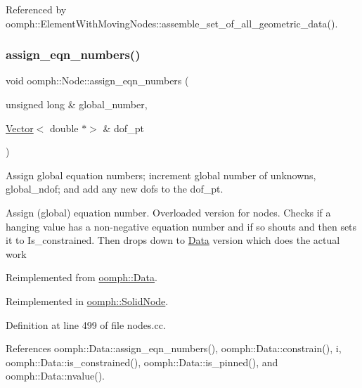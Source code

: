Referenced by oomph\+::\+Element\+With\+Moving\+Nodes\+::assemble\+\_\+set\+\_\+of\+\_\+all\+\_\+geometric\+\_\+data().

\mbox{\label{classoomph_1_1Node_a84ee77907c07ede64d98e809d9b0ffe0}} 
\subsubsection{\texorpdfstring{assign\+\_\+eqn\+\_\+numbers()}{assign\_eqn\_numbers()}}
{\footnotesize\ttfamily void oomph\+::\+Node\+::assign\+\_\+eqn\+\_\+numbers (\begin{DoxyParamCaption}\item[{unsigned long \&}]{global\+\_\+number,  }\item[{\hyperlink{classoomph_1_1Vector}{Vector}$<$ double $\ast$$>$ \&}]{dof\+\_\+pt }\end{DoxyParamCaption})\hspace{0.3cm}{\ttfamily [virtual]}}



Assign global equation numbers; increment global number of unknowns, global\+\_\+ndof; and add any new dofs to the dof\+\_\+pt. 

Assign (global) equation number. Overloaded version for nodes. Checks if a hanging value has a non-\/negative equation number and if so shouts and then sets it to Is\+\_\+constrained. Then drops down to \hyperlink{classoomph_1_1Data}{Data} version which does the actual work 

Reimplemented from \hyperlink{classoomph_1_1Data_a7b26834562644d212f8bb5c7ed482c61}{oomph\+::\+Data}.



Reimplemented in \hyperlink{classoomph_1_1SolidNode_aae4b4c238455ded700e5aac8b058e27d}{oomph\+::\+Solid\+Node}.



Definition at line 499 of file nodes.\+cc.



References oomph\+::\+Data\+::assign\+\_\+eqn\+\_\+numbers(), oomph\+::\+Data\+::constrain(), i, oomph\+::\+Data\+::is\+\_\+constrained(), oomph\+::\+Data\+::is\+\_\+pinned(), and oomph\+::\+Data\+::nvalue().

\mbox{\label{classoomph_1_1Node_aa7f4a0c93bc405bb7ac9577c38bf0437}} 
